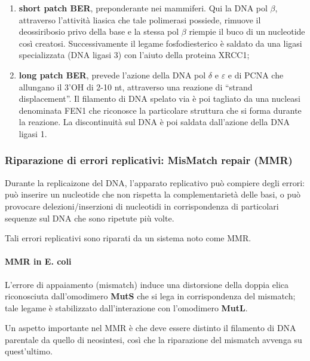 \documentclass[]{article}
\begin{document}
\begin{enumerate}
\def\labelenumi{\arabic{enumi}.}
\itemsep1pt\parskip0pt
\item
  \textbf{short patch BER}, preponderante nei mammiferi. Qui la DNA pol
  \(\beta\), attraverso l'attività liasica che tale polimerasi possiede,
  rimuove il deossiribosio privo della base e la stessa pol \(\beta\)
  riempie il buco di un nucleotide così creatosi. Successivamente il
  legame fosfodiesterico è saldato da una ligasi specializzata (DNA
  ligasi 3) con l'aiuto della proteina XRCC1;
\item
  \textbf{long patch BER}, prevede l'azione della DNA pol \(\delta\) e
  \(\varepsilon\) e di PCNA che allungano il 3'OH di 2-10 nt, attraverso
  una reazione di ``strand displacement''. Il filamento di DNA spelato
  via è poi tagliato da una nucleasi denominata FEN1 che riconosce la
  particolare struttura che si forma durante la reazione. La
  discontinuità sul DNA è poi saldata dall'azione della DNA ligasi 1.
\end{enumerate}

\subsubsection{Riparazione di errori replicativi: MisMatch repair
(MMR)}\label{riparazione-di-errori-replicativi-mismatch-repair-mmr}

Durante la replicaizone del DNA, l'apparato replicativo può compiere
degli errori: può inserire un nucleotide che non rispetta la
complementarietà delle basi, o può provocare delezioni/inserzioni di
nucleotidi in corrispondenza di particolari sequenze sul DNA che sono
ripetute più volte.

Tali errori replicativi sono riparati da un sistema noto come MMR.

\paragraph{MMR in E. coli}\label{mmr-in-e.-coli}

L'errore di appaiamento (mismatch) induce una distorsione della doppia
elica riconosciuta dall'omodimero \textbf{MutS} che si lega in
corrispondenza del mismatch; tale legame è stabilizzato dall'interazione
con l'omodimero \textbf{MutL}.

Un aspetto importante nel MMR è che deve essere distinto il filamento di
DNA parentale da quello di neosintesi, così che la riparazione del
mismatch avvenga su quest'ultimo.
\end{document}
